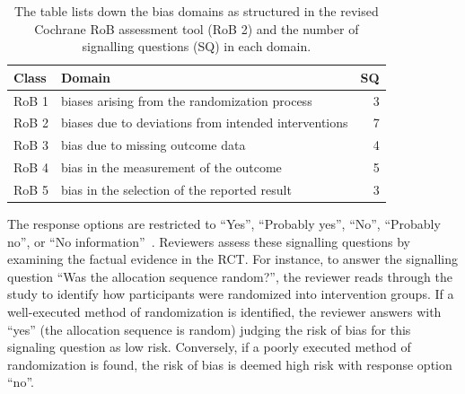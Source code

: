 \documentclass[sn-mathphys,Numbered]{sn-jnl}%
\theoremstyle{thmstyleone}%
\theoremstyle{thmstyletwo}%
\theoremstyle{thmstylethree}%
\begin{document}
%
%
%
\begin{table}
 \centering
   \caption{The table lists down the bias domains as structured in the revised Cochrane RoB assessment tool (RoB 2) and the number of signalling questions (SQ) in each domain.}\label{tab:robdomains}
    \begin{tabular}{llr}
    \toprule
     Class & Domain & SQ\\
    \midrule
    RoB 1 & biases arising from the randomization process &  3\\
    RoB 2 & biases due to deviations from intended interventions & 7\\
    RoB 3 & bias due to missing outcome data & 4\\
    RoB 4 & bias in the measurement of the outcome & 5\\
    RoB 5 & bias in the selection of the reported result & 3\\
    \bottomrule
    \end{tabular}
\end{table}
%
%
%


The response options are restricted to ``Yes'', ``Probably yes'', ``No'', ``Probably no'', or ``No information''~\cite{sterne2019rob}.
Reviewers assess these signalling questions by examining the factual evidence in the RCT.
For instance, to answer the signalling question ``Was the allocation sequence random?'', the reviewer reads through the study to identify how participants were randomized into intervention groups.
If a well-executed method of randomization is identified, the reviewer answers with ``yes'' (the allocation sequence is random) judging the risk of bias for this signaling question as low risk.
Conversely, if a poorly executed method of randomization is found, the risk of bias is deemed  high risk with response option ``no''.
\end{document}
